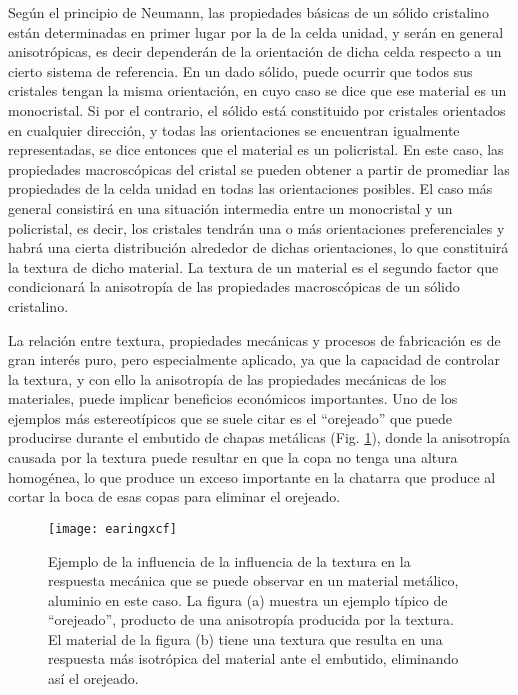 Según el principio de Neumann\cite{nye1985physical}, las propiedades básicas de un sólido cristalino están determinadas en primer lugar por la de la celda unidad, y serán en general anisotrópicas, es decir dependerán de la orientación de dicha celda respecto a un cierto sistema de referencia.
En un dado sólido, puede ocurrir que todos sus cristales tengan la misma orientación, en cuyo caso se dice que ese material es un monocristal.
Si por el contrario, el sólido está constituido por cristales orientados en cualquier dirección, y todas las orientaciones se encuentran igualmente representadas, se dice entonces que el material es un policristal.
En este caso, las propiedades macroscópicas del cristal se pueden obtener a partir de promediar las propiedades de la celda unidad en todas las orientaciones posibles.
El caso más general consistirá en una situación intermedia entre un monocristal y un policristal, es decir, los cristales tendrán una o más orientaciones preferenciales y habrá una cierta distribución alrededor de dichas orientaciones, lo que constituirá la textura de dicho material. 
La textura de un material es el segundo factor que condicionará la anisotropía de las propiedades macroscópicas de un sólido cristalino.

La relación entre textura, propiedades mecánicas y procesos de fabricación es de gran interés puro, pero especialmente aplicado, ya que la capacidad de controlar la textura, y con ello la anisotropía de las propiedades mecánicas de los materiales, puede implicar beneficios económicos importantes.
Uno de los ejemplos más estereotípicos que se suele citar es el ``orejeado'' que puede producirse durante el embutido de chapas metálicas (Fig. \ref{fig:earing}), donde la anisotropía causada por la textura puede resultar en que la copa no tenga una altura homogénea, lo que produce un exceso importante en la chatarra que produce al cortar la boca de esas copas para eliminar el orejeado.

\begin{figure}[!htb]
  \centering
  \texttt{[image: earingxcf]}
  \caption{Ejemplo de la influencia de la influencia de la textura en la respuesta mecánica que se puede observar en un material metálico, aluminio en este caso. La figura (a) muestra un ejemplo típico de ``orejeado'', producto de una anisotropía producida por la textura. El material de la figura (b) tiene una textura que resulta en una respuesta más isotrópica del material ante el embutido, eliminando así el orejeado. }
  \label{fig:earing}
\end{figure}

